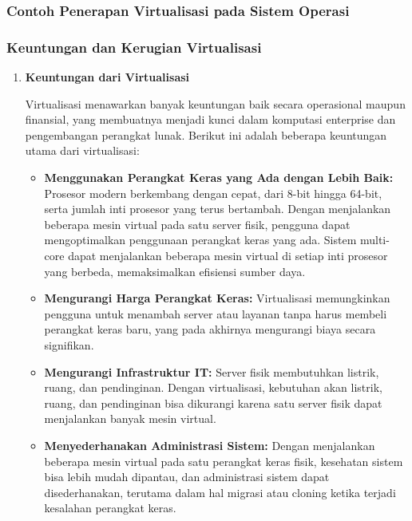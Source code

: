 \documentclass[12pt]{article}
\begin{document}
\subsubsection{Contoh Penerapan Virtualisasi pada Sistem Operasi}
\subsubsection{Keuntungan dan Kerugian Virtualisasi}

\begin{enumerate}
    \item \textbf{Keuntungan dari Virtualisasi}
    \par Virtualisasi menawarkan banyak keuntungan baik secara operasional maupun finansial, yang membuatnya menjadi kunci dalam komputasi enterprise dan pengembangan perangkat lunak. Berikut ini adalah beberapa keuntungan utama dari virtualisasi: 

\begin{itemize}
    \item \textbf{Menggunakan Perangkat Keras yang Ada dengan Lebih Baik:} 
    Prosesor modern berkembang dengan cepat, dari 8-bit hingga 64-bit, serta jumlah inti prosesor yang terus bertambah. Dengan menjalankan beberapa mesin virtual pada satu server fisik, pengguna dapat mengoptimalkan penggunaan perangkat keras yang ada. Sistem multi-core dapat menjalankan beberapa mesin virtual di setiap inti prosesor yang berbeda, memaksimalkan efisiensi sumber daya.
    
    \item \textbf{Mengurangi Harga Perangkat Keras:} 
    Virtualisasi memungkinkan pengguna untuk menambah server atau layanan tanpa harus membeli perangkat keras baru, yang pada akhirnya mengurangi biaya secara signifikan.
    
    \item \textbf{Mengurangi Infrastruktur IT:} 
    Server fisik membutuhkan listrik, ruang, dan pendinginan. Dengan virtualisasi, kebutuhan akan listrik, ruang, dan pendinginan bisa dikurangi karena satu server fisik dapat menjalankan banyak mesin virtual.
    
    \item \textbf{Menyederhanakan Administrasi Sistem:} 
    Dengan menjalankan beberapa mesin virtual pada satu perangkat keras fisik, kesehatan sistem bisa lebih mudah dipantau, dan administrasi sistem dapat disederhanakan, terutama dalam hal migrasi atau cloning ketika terjadi kesalahan perangkat keras.
    

\end{itemize}
\end{enumerate}
\end{document}
